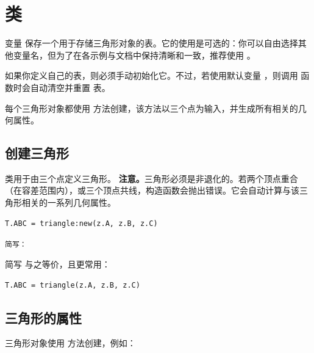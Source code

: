 \newpage
\section{ 类} %


变量  保存一个用于存储三角形对象的表。它的使用是可选的：你可以自由选择其他变量名，但为了在各示例与文档中保持清晰和一致，推荐使用 。

\medskip
如果你定义自己的表，则必须手动初始化它。不过，若使用默认变量 ，则调用  函数时会自动清空并重置  表。

\medskip
每个三角形对象都使用  方法创建，该方法以三个点为输入，并生成所有相关的几何属性。

\vspace{1em}

\subsection{创建三角形}
\label{sub:creating_a_triangle}

 类用于由三个点定义三角形。
\textbf{注意。}三角形必须是非退化的。若两个顶点重合（在容差范围内），或三个顶点共线，构造函数会抛出错误。它会自动计算与该三角形相关的一系列几何属性。

\begin{mybox}
\begin{verbatim}
T.ABC = triangle:new(z.A, z.B, z.C)
\end{verbatim}
\end{mybox}

\texttt{简写：}

简写  与之等价，且更常用：

\begin{mybox}
\begin{verbatim}
T.ABC = triangle(z.A, z.B, z.C)
\end{verbatim}
\end{mybox}


\subsection{三角形的属性} %

三角形对象使用  方法创建，例如：

\begin{center}
\end{center}

